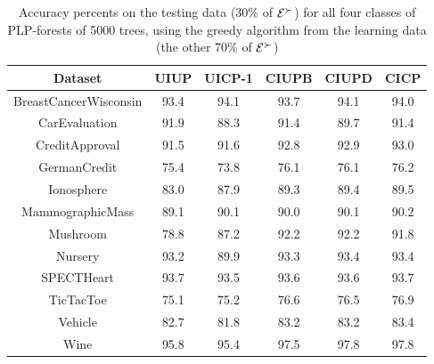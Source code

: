 \begin{table}
  \centering
  \small
  \caption{Accuracy percents on the testing data (30\% of $\mathcal{E}^\succ$)
					 for all four classes of PLP-forests of 5000 trees, 
					 using the greedy algorithm from the learning 
					 data (the other 70\% of $\mathcal{E}^\succ$)}
  \begin{tabular}{ |c||c|c|c|c|c| }
    \hline
    Dataset          				 & UIUP & UICP-1 & CIUPB & CIUPD & CICP \\
    \hline \hline                                              
    BreastCancerWisconsin                      & 93.4 & 94.1   & 93.7  & 94.1  & 94.0 \\ \hline
    CarEvaluation                       & 91.9 & 88.3   & 91.4  & 89.7  & 91.4 \\ \hline
    CreditApproval                       & 91.5 & 91.6   & 92.8  & 92.9  & 93.0 \\ \hline 
    GermanCredit                       & 75.4 & 73.8   & 76.1  & 76.1  & 76.2 \\ \hline     
    Ionosphere                       & 83.0 & 87.9   & 89.3  & 89.4  & 89.5 \\ \hline   
    MammographicMass                       & 89.1 & 90.1   & 90.0  & 90.1  & 90.2 \\ \hline         
    Mushroom                       & 78.8 & 87.2   & 92.2  & 92.2  & 91.8 \\ \hline 
    Nursery                       & 93.2 & 89.9   & 93.3  & 93.4  & 93.4 \\ \hline
    SPECTHeart                       & 93.7 & 93.5   & 93.6  & 93.6  & 93.7 \\ \hline   
    TicTacToe                      & 75.1 & 75.2   & 76.6  & 76.5  & 76.9 \\ \hline 
    Vehicle                       & 82.7 & 81.8   & 83.2  & 83.2  & 83.4 \\ \hline
    Wine                       & 95.8 & 95.4   & 97.5  & 97.8  & 97.8 \\ \hline
  \end{tabular}
  \label{tbl:forests2}
\end{table}


